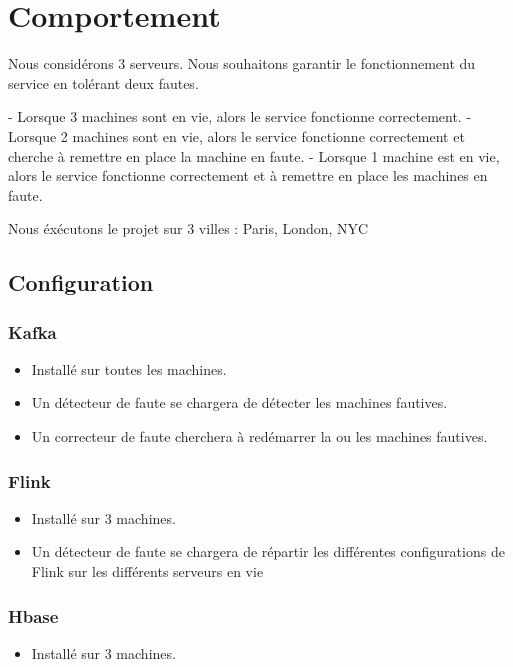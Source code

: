 \documentclass[a4paper,oneside,10pt]{article}
\begin{document}
\section{Comportement}

Nous considérons 3 serveurs. Nous souhaitons garantir le fonctionnement du service en tolérant deux fautes. 

- Lorsque 3 machines sont en vie, alors le service fonctionne correctement.
- Lorsque 2 machines sont en vie, alors le service fonctionne correctement et cherche à remettre en place la machine en faute.
- Lorsque 1 machine est en vie, alors le service fonctionne correctement et à remettre en place les machines en faute. 

Nous éxécutons le projet sur 3 villes : Paris, London, NYC

\subsection{Configuration}

\subsubsection{Kafka}

\begin{itemize}
\item Installé sur toutes les machines. 
\item Un détecteur de faute se chargera de détecter les machines fautives.
\item Un correcteur de faute cherchera à redémarrer la ou les machines fautives.
\end{itemize}

\subsubsection{Flink}

\begin{itemize}
\item Installé sur 3 machines. 
\item Un détecteur de faute se chargera de répartir les différentes configurations de Flink sur les différents serveurs en vie
\end{itemize}

\subsubsection{Hbase}

\begin{itemize}
\item Installé sur 3 machines. 
\end{itemize}	
\end{document}
